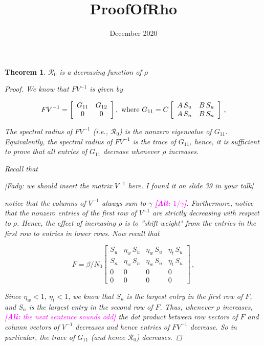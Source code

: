 \documentclass{article}
\title{ProofOfRho}
\date{December 2020}
\newtheorem{theorem}[]{Theorem}
\newcommand{\Rnum}{\mathcal{R}_0}
\newcommand{\comment}{\showcomment}
\newcommand{\showcomment}[3]{\textcolor{#1}{\textbf{[#2: }\textsl{#3}\textbf{]}}}
\newcommand{\ali}[1]{\comment{magenta}{Ali}{#1}}
\begin{document}
\begin{theorem}
$\Rnum$ is a decreasing function of $\rho$
\begin{proof}
We know that $FV^{-1}$ is given by

\begin{equation}
FV^{-1} = \left[ \begin {array}{cc}
G_{11}&G_{12}\\ 
0&0
\end {array} \right], \text{ where } \\
G_{11} =C
\left[\begin {array}{cc}
A\,S_u & B\,S_u\\
A\,S_n & B\,S_n
\end {array}\right]\nonumber \, ,
\end{equation}

The spectral radius of $FV^{-1}$ (i.e., $\Rnum$) is the nonzero eigenvalue of $G_{11}$. Equivalently, the spectral radius of $FV^{-1}$ is the trace of $G_{11}$, hence, it is sufficient to prove that all entries of $G_{11}$ decrease whenever $\rho$ increases.

Recall that

[Fady: we should insert the matrix $V^{-1}$ here. I found it on slide 39 in your talk]

notice that the columns of $V^{-1}$ always sum to $\gamma$ \ali{$1/\gamma$}. Furthermore, notice that the nonzero entries of the first row of $V^{-1}$ are strictly decreasing with respect to $\rho$.  Hence, the effect of increasing $\rho$ is to ''shift weight" from the entries in the first row to entries in lower rows. Now recall that

\begin{equation}
F = \beta/N_0 \left[ \begin {array}{cccc} 
S_u&\eta_w\,S_u&\eta_w\,S_u&\eta_t\,S_u\\
S_n&\eta_w\,S_n&\eta_w\,S_n&\eta_t\,S_n\\ 
0&0&0&0\\
0&0&0&0
\end {array} \right]\,,
\end{equation}

Since $\eta_w < 1$, $\eta_t < 1$, we know that $S_u$ is the largest entry in the first row of $F$, and $S_n$ is the largest entry in the second row of $F$. Thus, whenever $\rho$ increases, \ali{the next sentence sounds odd} the dot product between row vectors of $F$ and column vectors of $V^{-1}$ decreases and hence entries of $FV^{-1}$ decrease. So in particular, the trace of $G_{11}$ (and hence $\Rnum$) decreases.

\end{proof}
\end{theorem}
\end{document}
